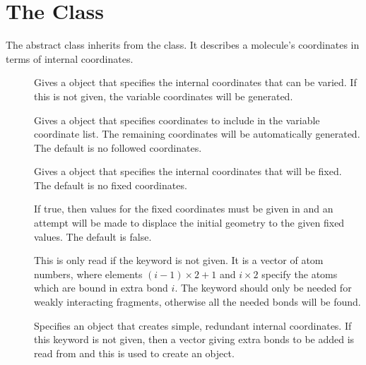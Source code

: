 
\section{The  Class}\label{IntMolecularCoor}

The  abstract class inherits from the
 class.  It describes a molecule's coordinates in
terms of internal coordinates.

\begin{description}
  \item[] Gives a  object that
    specifies the internal coordinates that can be varied. If this is not
    given, the variable coordinates will be generated.

  \item[] Gives a  object that
    specifies coordinates to include in the variable coordinate list.  The
    remaining coordinates will be automatically generated.  The default is
    no followed coordinates.

  \item[] Gives a  object that specifies
    the internal coordinates that will be fixed.  The default is no
    fixed coordinates.

  \item[] If true, then values for the fixed
    coordinates must be given in  and an attempt will be made
    to displace the initial geometry to the given fixed values. The default
    is false.

  \item[] This is only read if the 
     keyword is not given.  It is a vector of atom numbers, where elements
     $(i-1)\times 2 + 1$ and $i\times 2$ specify the atoms which are
     bound in extra bond $i$.  The  keyword should only
     be needed for weakly interacting fragments, otherwise all the needed
     bonds will be found.

  \item[] Specifies an  object that
    creates simple, redundant internal coordinates. If this keyword is not
    given, then a vector giving extra bonds to be added is read from
     and this is used to create an
     object.


\end{description}
